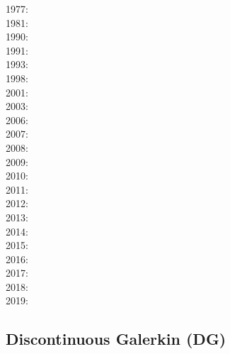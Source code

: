\noindent
{\scriptsize
1977: \cite{rola77}\\
1981: \cite{dzan81}\\
1990: \cite{lips90}\\
1991: \cite{spak91}\\
1993: \cite{kara93}\\
1998: \cite{bisp98}\\
2001: \cite{buda01}\\
2003: \cite{krhh03}\cite{sosi03}\cite{pimo03}\cite{sosi03}\\
2006: \cite{masr06}\\
2007: \cite{mitk07}\cite{lobc07}\cite{rimb07}\\
2008: \cite{zhou08}\cite{zhou08}\cite{roma08}\\
2009: \cite{scbr09}\\
2010: \cite{dada10}\cite{sifb10}\\
2011: \cite{ridv11}\\
2012: \cite{hawj12}\cite{resa12}\cite{hawj12}\cite{fesw12}\cite{simj12}\\
2013: \cite{ress13}\cite{ebbf13}\cite{davi13}\\
2014: \cite{paml14}\cite{ebbf14}\cite{krbk14}\cite{licl14}\\
2015: \cite{boem15}\cite{brrs15}\\
2016: \cite{kord16}\cite{moek16}\cite{rond16}\cite{duti16a,duti16b}\cite{cogb16}\\
2017: \cite{roev17}\\
2018: \cite{pabn18}\cite{hamp18}\cite{ghmc18}\\
2019: \cite{sopg19}\cite{shar19}
}

\subsection{Discontinuous Galerkin (DG)}

